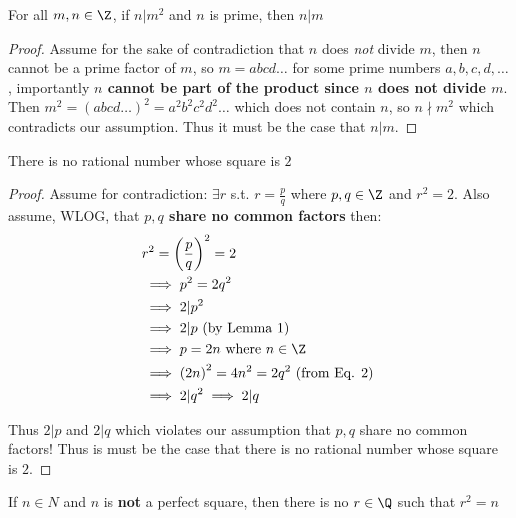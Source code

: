\begin{lemma}
	For all $m, n \in \Z$, if $n \vert m^{2}$ and $n$ is prime, then $n \vert m$
\end{lemma}

\begin{proof}
	Assume for the sake of contradiction that $n$ does \textit{not} divide $m$, then $n$ cannot be a prime factor of $m$, so $m = abcd\ldots$ for some prime numbers $a, b, c, d, \ldots$, importantly \textbf{$n$ cannot be part of the product since $n$ does not divide  $m$}. Then $m^{2} = \left( abcd\ldots \right)^{2} = a^{2}b^{2}c^{2}d^{2} \ldots$ which does not contain $n$, so  $n \nmid m^{2}$ which contradicts our assumption. Thus it must be the case that $n \vert m$.
\end{proof}

\begin{theorem}
	There is no rational number whose square is $2$
\end{theorem}

\begin{proof}
	Assume for contradiction: $\exists r$ s.t.  $r = \frac{p}{q}$ where $p, q \in  \Z$ and $r^{2} = 2$. Also assume, WLOG, that \textbf{$p, q$ share no common factors} then:
	\begin{align}
		&r^{2} = \left( \frac{p}{q} \right) ^{2} = 2 \\
		& \implies p^{2} = 2q^{2} \\
		& \implies 2 \vert p^{2} \\
		& \implies 2 \vert p \text{ (by Lemma 1)} \\ 
		&\implies p = 2n \text{ where } n \in \Z \\
		& \implies \left( 2n \right)^{2} = 4n^{2} = 2q^{2} \text{ (from Eq. 2) } \\
		& \implies 2 \vert q^{2} \implies 2 \vert q 
	\end{align}

	Thus $2 \vert p$ and $2 \vert q$ which violates our assumption that $p, q$ share no common factors! Thus is must be the case that there is no rational number whose square is $2$.

\end{proof}


\begin{theorem}
	If $n \in N$ and $n$ is \textbf{not} a perfect square, then there is no $r \in \Q$ such that $r^{2} = n $
\end{theorem}

